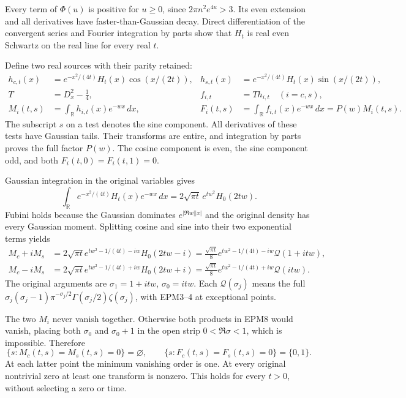 \documentclass[
  10pt,
  a4paper,
]{article}
\begin{document}
Every term of \(\Phi(u)\) is positive for \(u\ge0\), since
\(2\pi n^2e^{4u}>3\). Its even extension and all derivatives have
faster-than-Gaussian decay. Direct differentiation of the convergent
series and Fourier integration by parts show that \(H_t\) is real even
Schwartz on the real line for every real \(t\).

Define two real sources with their parity retained: \[
\begin{aligned}
h_{c,t}(x)&=e^{-x^2/(4t)}H_t(x)\cos(x/(2t)),&
h_{s,t}(x)&=e^{-x^2/(4t)}H_t(x)\sin(x/(2t)),\\
T&=D_x^2-\tfrac14,& f_{i,t}&=Th_{i,t}\quad(i=c,s),\\
M_i(t,s)&=\int_{\mathbb R}h_{i,t}(x)e^{-wx}\,dx,&
F_i(t,s)&=\int_{\mathbb R}f_{i,t}(x)e^{-wx}\,dx=P(w)M_i(t,s).
\end{aligned}\tag{EPM6}
\] The subscript \(s\) on a test denotes the sine component. All
derivatives of these tests have Gaussian tails. Their transforms are
entire, and integration by parts proves the full factor \(P(w)\). The
cosine component is even, the sine component odd, and both
\(F_i(t,0)=F_i(t,1)=0\).

Gaussian integration in the original variables gives \[
\int_{\mathbb R}e^{-x^2/(4t)}H_t(x)e^{-wx}\,dx
=2\sqrt{\pi t}\,e^{tw^2}H_0(2tw).
\tag{EPM7}
\] Fubini holds because the Gaussian dominates \(e^{|\Re w||x|}\) and
the original density has every Gaussian moment. Splitting cosine and
sine into their two exponential terms yields \[
\begin{aligned}
M_c+iM_s&=2\sqrt{\pi t}e^{tw^2-1/(4t)-iw}H_0(2tw-i)
=\frac{\sqrt{\pi t}}8e^{tw^2-1/(4t)-iw}\mathcal Q(1+itw),\\
M_c-iM_s&=2\sqrt{\pi t}e^{tw^2-1/(4t)+iw}H_0(2tw+i)
=\frac{\sqrt{\pi t}}8e^{tw^2-1/(4t)+iw}\mathcal Q(itw).
\end{aligned}\tag{EPM8}
\] The original arguments are \(\sigma_1=1+itw\), \(\sigma_0=itw\). Each
\(\mathcal Q(\sigma_j)\) means the full
\(\sigma_j(\sigma_j-1)\pi^{-\sigma_j/2}\Gamma(\sigma_j/2)\zeta(\sigma_j)\),
with EPM3--4 at exceptional points.

The two \(M_i\) never vanish together. Otherwise both products in EPM8
would vanish, placing both \(\sigma_0\) and \(\sigma_0+1\) in the open
strip \(0<\Re\sigma<1\), which is impossible. Therefore \[
\{s:M_c(t,s)=M_s(t,s)=0\}=\varnothing,\qquad
\{s:F_c(t,s)=F_s(t,s)=0\}=\{0,1\}.
\tag{EPM9}
\] At each latter point the minimum vanishing order is one. At every
original nontrivial zero at least one transform is nonzero. This holds
for every \(t>0\), without selecting a zero or time.
\end{document}
